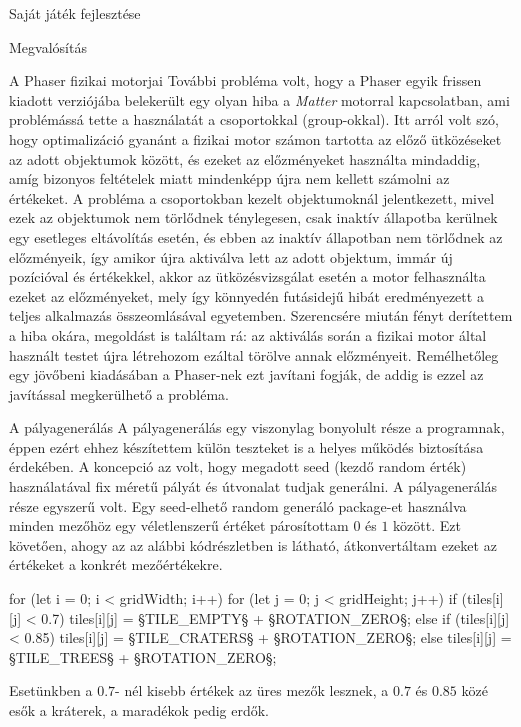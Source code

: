 \begin{MyChapter}{Saját játék fejlesztése}
\begin{MySection}{Megvalósítás}
\begin{MySubSection}{A Phaser fizikai motorjai}
			További probléma volt, hogy a Phaser egyik frissen kiadott verziójába belekerült egy olyan hiba a \textit{Matter} motorral kapcsolatban, ami problémássá tette a használatát a csoportokkal (group-okkal). Itt arról volt szó, hogy optimalizáció gyanánt a fizikai motor számon tartotta az előző ütközéseket az adott objektumok között, és ezeket az előzményeket használta mindaddig, amíg bizonyos feltételek miatt mindenképp újra nem kellett számolni az értékeket. A probléma a csoportokban kezelt objektumoknál jelentkezett, mivel ezek az objektumok nem törlődnek ténylegesen, csak inaktív állapotba kerülnek egy esetleges eltávolítás esetén, és ebben az inaktív állapotban nem törlődnek az előzményeik, így amikor újra aktiválva lett az adott objektum, immár új pozícióval és értékekkel, akkor az ütközésvizsgálat esetén a motor felhasználta ezeket az előzményeket, mely így könnyedén futásidejű hibát eredményezett a teljes alkalmazás összeomlásával egyetemben. Szerencsére miután fényt derítettem a hiba okára, megoldást is találtam rá: az aktiválás során a fizikai motor által használt testet újra létrehozom ezáltal törölve annak előzményeit. Remélhetőleg egy jövőbeni kiadásában a Phaser-nek ezt javítani fogják, de addig is ezzel az javítással megkerülhető a probléma.
		\end{MySubSection}
		
		\begin{MySubSection}{A pályagenerálás}
			A pályagenerálás egy viszonylag bonyolult része a programnak, éppen ezért ehhez készítettem külön teszteket is a helyes működés biztosítása érdekében.
			A koncepció az volt, hogy megadott seed (kezdő random érték) használatával fix méretű pályát és útvonalat tudjak generálni. A pályagenerálás része egyszerű volt. Egy seed-elhető random generáló package-et használva minden mezőhöz egy véletlenszerű értéket párosítottam $0$ és $1$ között. Ezt követően, ahogy az az alábbi kódrészletben is látható, átkonvertáltam ezeket az értékeket a konkrét mezőértékekre.
			\begin{javascript}
for (let i = 0; i < gridWidth; i++) {
	for (let j = 0; j < gridHeight; j++) {
		if (tiles[i][j] < 0.7) {
			tiles[i][j] = §\color{jsConst}TILE\_EMPTY§ + §\color{jsConst}ROTATION\_ZERO§;
		} else if (tiles[i][j] < 0.85) {
			tiles[i][j] = §\color{jsConst}TILE\_CRATERS§ + §\color{jsConst}ROTATION\_ZERO§;
		} else {
			tiles[i][j] = §\color{jsConst}TILE\_TREES§ + §\color{jsConst}ROTATION\_ZERO§;
		}
	}
}
			\end{javascript}
			Esetünkben a $0.7$- nél kisebb értékek az üres mezők lesznek, a $0.7$ és $0.85$ közé esők a kráterek, a maradékok pedig erdők.
			

\end{MySubSection}
\end{MySection}
\end{MyChapter}

